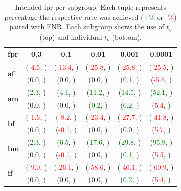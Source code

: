 \begin{table}
\begin{center}
\glsunsetall
\caption{Intended \gls{fpr} per subgroup. Each tuple represents percentage the respective rate was achieved (\textcolor{green}{+\%} or \textcolor{red}{-\%}) paired with FNR. Each subgroup shows the use of $t_g$ (top) and individual $t_o$ (bottom).}
\begin{tabular}{l c c c c c}
     \gls{fpr} & 0.3 & 0.1 & 0.01 & 0.001 & 0.0001\\\midrule
    \multirow{2}{.1mm}{\textbf{\gls{af}}} & (\textcolor{red}{-4.5}, )&(\textcolor{red}{-13.4}, )  &(\textcolor{red}{-25.8}, ) &(\textcolor{red}{-25.8}, )  &(\textcolor{red}{-25.5}, )  \\[-4pt]
        & (0.0, ) &(0.0, )  & (0.0, ) &  (\textcolor{green}{0.1}, )&(\textcolor{red}{-5.6}, )  \\[-1pt]
        
    \multirow{2}{3mm}{\textbf{\gls{am}}}&(\textcolor{green}{2.3}, )&(\textcolor{green}{4.1}, )&(\textcolor{green}{11.2}, )&(\textcolor{green}{14.5}, )&(\textcolor{green}{52.1}, ) \\[-4pt]
        & (0.0, ) &(0.0, )  & (\textcolor{green}{0.2}, ) & (\textcolor{green}{0.2}, ) & (\textcolor{red}{5.4}, )\\[-1pt]
        
    \multirow{2}{3mm}{\textbf{\gls{bf}}}& (\textcolor{red}{-1.6}, ) &(\textcolor{red}{-8.2}, ) &(\textcolor{red}{-23.4}, ) &(\textcolor{red}{-27.7}, ) &(\textcolor{red}{-41.8}, ) \\[-4pt]
        & (0.0, ) &(\textcolor{red}{-0.1}, )  & (0.0, ) & (0.0, ) & (\textcolor{red}{5.7}, )\\[-1pt]
        
    \multirow{2}{3mm}{\textbf{\gls{bm}}}&(\textcolor{green}{2.3}, )&(\textcolor{green}{6.5}, )&(\textcolor{green}{17.6}, )&(\textcolor{green}{29.8}, )&(\textcolor{green}{95.8}, ) \\[-4pt]
        & (0.0, ) &(\textcolor{red}{-0.1}, )  & (0.0, ) & (\textcolor{green}{0.1}, ) & (\textcolor{red}{5.5}, )\\[-1pt]
        
    \multirow{2}{3mm}{\textbf{\gls{if}}} &(\textcolor{red}{-9.0}, ) &(\textcolor{red}{-26.1}, ) &(\textcolor{red}{-58.6}, ) &(\textcolor{red}{-46.1}, ) &(\textcolor{red}{-60.9}, )\\[-4pt]
        & (0.0, ) &(0.0, )  & (0.0, ) & (\textcolor{green}{0.2}, ) & (\textcolor{red}{5.4}, )\\[-1pt]
        

\end{tabular}
\end{center}
\end{table}
